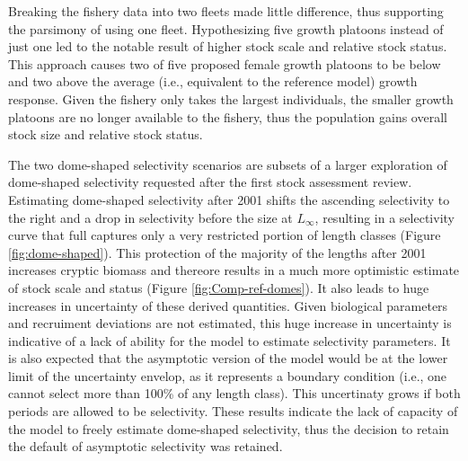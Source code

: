 \documentclass[11pt,
  english,
  a4paper,
]{article}
\begin{document}

Breaking the fishery data into two fleets made little difference, thus supporting the parsimony of using one fleet. Hypothesizing five growth platoons instead of just one led to the notable result of higher stock scale and relative stock status. This approach causes two of five proposed female growth platoons to be below and two above the average (i.e., equivalent to the reference model) growth response. Given the fishery only takes the largest individuals, the smaller growth platoons are no longer available to the fishery, thus the population gains overall stock size and relative stock status.

\leavevmode\tagmcend\tagstructend\par


The two dome-shaped selectivity scenarios are subsets of a larger exploration of dome-shaped selectivity requested after the first stock assessment review. Estimating dome-shaped selectivity after 2001 shifts the ascending selectivity to the right and a drop in selectivity before the size at {\(L_{\infty}\)\leavevmode\tagmcend\tagstructend}, resulting in a selectivity curve that full captures only a very restricted portion of length classes (Figure \ref{fig:dome-shaped}). This protection of the majority of the lengths after 2001 increases cryptic biomass and thereore results in a much more optimistic estimate of stock scale and status (Figure \ref{fig:Comp-ref-domes}). It also leads to huge increases in uncertainty of these derived quantities. Given biological parameters and recruiment deviations are not estimated, this huge increase in uncertainty is indicative of a lack of ability for the model to estimate selectivity parameters. It is also expected that the asymptotic version of the model would be at the lower limit of the uncertainty envelop, as it represents a boundary condition (i.e., one cannot select more than 100\% of any length class). This uncertinaty grows if both periods are allowed to be selectivity. These results indicate the lack of capacity of the model to freely estimate dome-shaped selectivity, thus the decision to retain the default of asymptotic selectivity was retained.

\leavevmode\tagmcend\tagstructend\par

\end{document}
